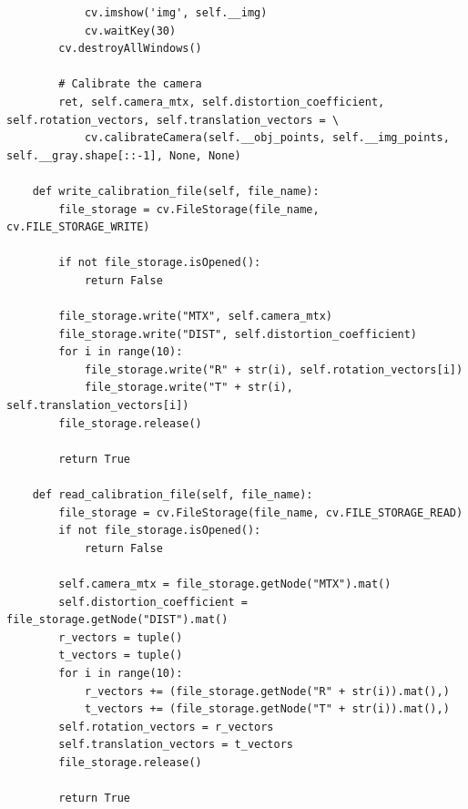 \documentclass[a4paper, 12pt]{article}
\begin{document}
\begin{lstlisting}
            cv.imshow('img', self.__img)
            cv.waitKey(30)
        cv.destroyAllWindows()

        # Calibrate the camera
        ret, self.camera_mtx, self.distortion_coefficient, self.rotation_vectors, self.translation_vectors = \
            cv.calibrateCamera(self.__obj_points, self.__img_points, self.__gray.shape[::-1], None, None)

    def write_calibration_file(self, file_name):
        file_storage = cv.FileStorage(file_name, cv.FILE_STORAGE_WRITE)

        if not file_storage.isOpened():
            return False

        file_storage.write("MTX", self.camera_mtx)
        file_storage.write("DIST", self.distortion_coefficient)
        for i in range(10):
            file_storage.write("R" + str(i), self.rotation_vectors[i])
            file_storage.write("T" + str(i), self.translation_vectors[i])
        file_storage.release()

        return True

    def read_calibration_file(self, file_name):
        file_storage = cv.FileStorage(file_name, cv.FILE_STORAGE_READ)
        if not file_storage.isOpened():
            return False

        self.camera_mtx = file_storage.getNode("MTX").mat()
        self.distortion_coefficient = file_storage.getNode("DIST").mat()
        r_vectors = tuple()
        t_vectors = tuple()
        for i in range(10):
            r_vectors += (file_storage.getNode("R" + str(i)).mat(),)
            t_vectors += (file_storage.getNode("T" + str(i)).mat(),)
        self.rotation_vectors = r_vectors
        self.translation_vectors = t_vectors
        file_storage.release()

        return True
	\end{lstlisting}
\end{document}
